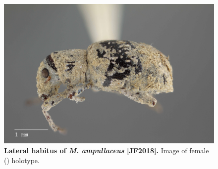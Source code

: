 \documentclass[fleqn,10pt,lineno]{wlpeerj} %
\begin{document}
\begin{figure}[h]
	\begin{sideways}
		\centering
		\includegraphics[height=\textwidth]{ampullaceus_F_lateral.jpg}
	\end{sideways}
	\caption{\textbf{Lateral habitus of \textit{M. ampullaceus} [JF2018].} Image of female (\female) holotype.}
	\label{fig:ampullaceus_F_lateral}
\end{figure}
\end{document}

